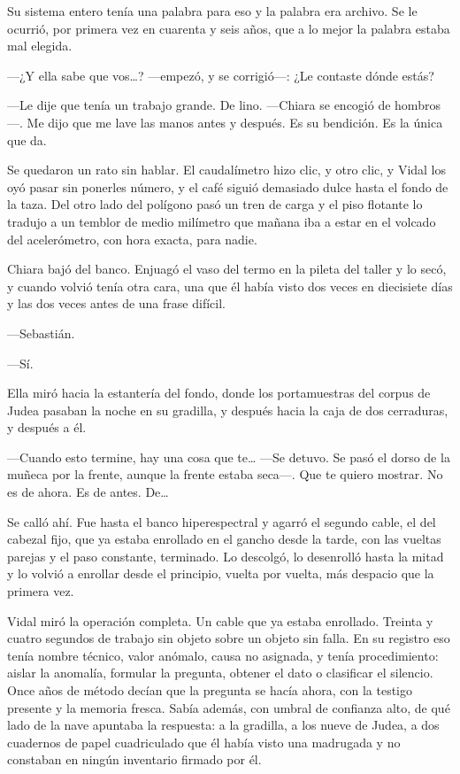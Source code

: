Su sistema entero tenía una palabra para eso y la palabra era archivo. Se le ocurrió, por primera vez en cuarenta y seis años, que a lo mejor la palabra estaba mal elegida.

---¿Y ella sabe que vos\ldots{}? ---empezó, y se corrigió---: ¿Le contaste dónde estás?

---Le dije que tenía un trabajo grande. De lino. ---Chiara se encogió de hombros---. Me dijo que me lave las manos antes y después. Es su bendición. Es la única que da.

Se quedaron un rato sin hablar. El caudalímetro hizo clic, y otro clic, y Vidal los oyó pasar sin ponerles número, y el café siguió demasiado dulce hasta el fondo de la taza. Del otro lado del polígono pasó un tren de carga y el piso flotante lo tradujo a un temblor de medio milímetro que mañana iba a estar en el volcado del acelerómetro, con hora exacta, para nadie.

Chiara bajó del banco. Enjuagó el vaso del termo en la pileta del taller y lo secó, y cuando volvió tenía otra cara, una que él había visto dos veces en diecisiete días y las dos veces antes de una frase difícil.

---Sebastián.

---Sí.

Ella miró hacia la estantería del fondo, donde los portamuestras del corpus de Judea pasaban la noche en su gradilla, y después hacia la caja de dos cerraduras, y después a él.

---Cuando esto termine, hay una cosa que te\ldots{} ---Se detuvo. Se pasó el dorso de la muñeca por la frente, aunque la frente estaba seca---. Que te quiero mostrar. No es de ahora. Es de antes. De\ldots{}

Se calló ahí. Fue hasta el banco hiperespectral y agarró el segundo cable, el del cabezal fijo, que ya estaba enrollado en el gancho desde la tarde, con las vueltas parejas y el paso constante, terminado. Lo descolgó, lo desenrolló hasta la mitad y lo volvió a enrollar desde el principio, vuelta por vuelta, más despacio que la primera vez.

Vidal miró la operación completa. Un cable que ya estaba enrollado. Treinta y cuatro segundos de trabajo sin objeto sobre un objeto sin falla. En su registro eso tenía nombre técnico, valor anómalo, causa no asignada, y tenía procedimiento: aislar la anomalía, formular la pregunta, obtener el dato o clasificar el silencio. Once años de método decían que la pregunta se hacía ahora, con la testigo presente y la memoria fresca. Sabía además, con umbral de confianza alto, de qué lado de la nave apuntaba la respuesta: a la gradilla, a los nueve de Judea, a dos cuadernos de papel cuadriculado que él había visto una madrugada y no constaban en ningún inventario firmado por él.

